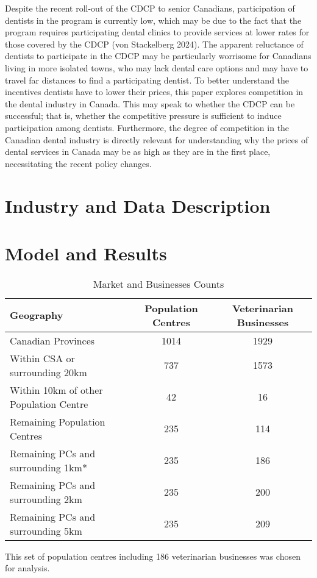 \documentclass[a4paper,11pt]{article}
\begin{document}
Despite the recent roll-out of the CDCP to senior Canadians, participation of dentists in the program is currently low, which may be due to the fact that the program requires participating dental clinics to provide services at lower rates for those covered by the CDCP (von Stackelberg 2024). The apparent reluctance of dentists to participate in the CDCP may be particularly worrisome for Canadians living in more isolated towns, who may lack dental care options and may have to travel far distances to find a participating dentist. To better understand the incentives dentists have to lower their prices, this paper explores competition in the dental industry in Canada. This may speak to whether the CDCP can be successful; that is, whether the competitive pressure is sufficient to induce participation among dentists. Furthermore, the degree of competition in the Canadian dental industry is directly relevant for understanding why the prices of dental services in Canada may be as high as they are in the first place, necessitating the recent policy changes.

\section{Industry and Data Description}

\section{Model and Results}


\begin{table}[h]  
\begin{threeparttable}
\caption{Market and Businesses Counts} %
\centering %
\begin{tabular}{l c c } %
\hline\hline   
 Geography & Population Centres & Veterinarian Businesses   
\\ [0.5ex]  
\hline   
Canadian Provinces & 1014 & 1929 \\
Within CSA or surrounding 20km & 737 & 1573 \\
Within 10km of other Population Centre & 42 & 16 \\
Remaining Population Centres & 235 & 114 \\

Remaining PCs and surrounding 1km* & 235 & 186 \\

Remaining PCs and surrounding 2km  & 235 & 200 \\

Remaining PCs and surrounding 5km  & 235 & 209 \\

\hline %
\end{tabular}  
\begin{tablenotes}
    \small  *This set of population centres including 186 veterinarian businesses was chosen for analysis. 
\end{tablenotes}
\end{threeparttable}
\end{table}  
\end{document}
